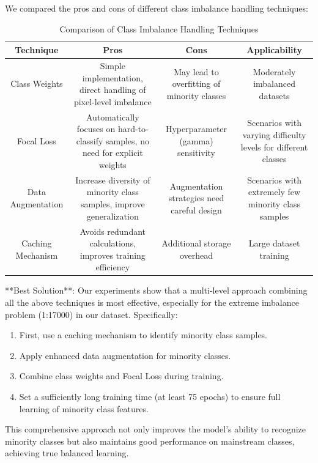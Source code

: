 \documentclass[conference]{IEEEtran}
\begin{document}

We compared the pros and cons of different class imbalance handling techniques:

\begin{table}
    \centering
    \caption{Comparison of Class Imbalance Handling Techniques}
    \begin{tabular}{|c|c|c|c|}
    \hline
    Technique & Pros & Cons & Applicability \\
    \hline
    Class Weights & Simple implementation, direct handling of pixel-level imbalance & May lead to overfitting of minority classes & Moderately imbalanced datasets \\
    Focal Loss & Automatically focuses on hard-to-classify samples, no need for explicit weights & Hyperparameter (gamma) sensitivity & Scenarios with varying difficulty levels for different classes \\
    Data Augmentation & Increase diversity of minority class samples, improve generalization & Augmentation strategies need careful design & Scenarios with extremely few minority class samples \\
    Caching Mechanism & Avoids redundant calculations, improves training efficiency & Additional storage overhead & Large dataset training \\
    \hline
    \end{tabular}
\end{table}


**Best Solution**: Our experiments show that a multi-level approach combining all the above techniques is most effective, especially for the extreme imbalance problem (1:17000) in our dataset. Specifically:

\begin{enumerate}
    \item First, use a caching mechanism to identify minority class samples.
    \item Apply enhanced data augmentation for minority classes.
    \item Combine class weights and Focal Loss during training.
    \item Set a sufficiently long training time (at least 75 epochs) to ensure full learning of minority class features.
\end{enumerate}

This comprehensive approach not only improves the model's ability to recognize minority classes but also maintains good performance on mainstream classes, achieving true balanced learning.
\end{document}
